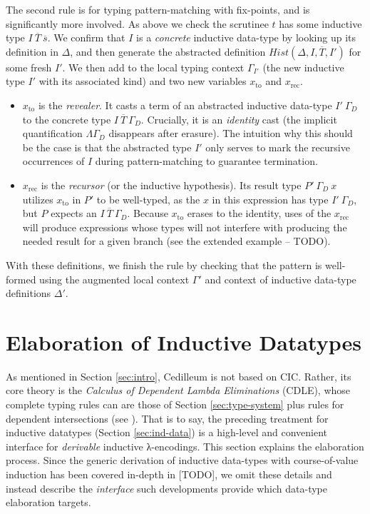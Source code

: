 \documentclass{article}
\newcommand{\vars}[1]{{\overline{#1}}}
\begin{document}
The second rule is for typing pattern-matching with fix-points, and is
significantly more involved. As above we check the scrutinee $t$ has some
inductive type $I\ \vars{T}\ \vars{s}$. We confirm that $I$ is a
\textit{concrete} inductive data-type by looking up its definition in $\Delta$,
and then generate the abstracted definition $Hist(\Delta,I,\vars{T},I')$ for some fresh
$I'$. We then add to the local typing context $\Gamma_{I'}$ (the new inductive
type $I'$ with its associated kind) and two new variables $x_{\text{to}}$ and
$x_{\text{rec}}$.

\begin{itemize}
\item $x_{\text{to}}$ is the \textit{revealer}. It casts a term of an abstracted inductive
  data-type $I'\ \Gamma_D$ to the concrete type $I\ \vars{T}\ \Gamma_D$.
  Crucially, it is an \textit{identity} cast (the implicit quantification
  $\Lambda \Gamma_D$ disappears after erasure). The intuition why this should be
  the case is that the abstracted type $I'$ only serves to mark the recursive
  occurrences of $I$ during pattern-matching to guarantee termination.
\item $x_{\text{rec}}$ is the \textit{recursor} (or the inductive hypothesis).
  Its result type $P'\ \Gamma_D\ x$ utilizes $x_{\text{to}}$ in $P'$ to be
  well-typed, as the $x$ in this expression has type $I'\ \Gamma_D$, but $P$
  expects an $I\ \vars{T}\ \Gamma_D$. Because $x_{\text{to}}$ erases to the identity, uses of the
  $x_{\text{rec}}$ will produce expressions whose types will not interfere with
  producing the needed result for a given branch (see the extended example --
  TODO).
\end{itemize}

\noindent With these definitions, we finish the rule by checking that the
pattern is well-formed using the augmented local context $\Gamma'$ and context
of inductive data-type definitions $\Delta'$.

\section{Elaboration of Inductive Datatypes}
As mentioned in Section \ref{sec:intro}, Cedilleum is not based on CIC. Rather,
its core theory is the \textit{Calculus of Dependent Lambda Eliminations}
(CDLE), whose complete typing rules can are those of Section
\ref{sec:type-system} plus rules for dependent intersections (see
\cite{St18_Cedille-Syntax-Semantics}). That is to say, the preceding treatment
for inductive datatypes (Section \ref{sec:ind-data}) is a high-level and
convenient interface for \textit{derivable} inductive λ-encodings. This section
explains the elaboration process. Since the generic derivation of inductive
data-types with course-of-value induction has been covered in-depth in [TODO],
we omit these details and instead describe the \textit{interface} such
developments provide which data-type elaboration targets.
\end{document}
